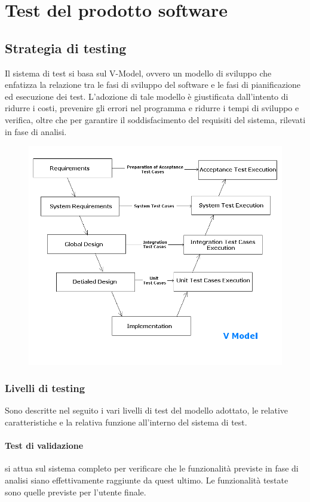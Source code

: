 \documentclass[12pt,a4paper]{article}
\begin{document}
\newpage

\section{Test del prodotto software}\label{test}

\subsection{Strategia di testing}\label{test_strategia}
Il sistema di test si basa sul V-Model, ovvero un modello di sviluppo che enfatizza la relazione tra le fasi di sviluppo del software e le fasi di pianificazione ed esecuzione dei test. L'adozione di tale modello è giustificata dall'intento di ridurre i costi, prevenire gli errori nel programma e ridurre i tempi di sviluppo e verifica, oltre che per garantire il soddisfacimento del requisiti del sistema, rilevati in fase di analisi.
\begin{figure}[h]
\centering
\includegraphics[width=0.9\linewidth]{../img/v-model}
\caption[V Model]{}
\label{fig:v-model}
\end{figure}

\subsubsection{Livelli di testing}
Sono descritte nel seguito i vari livelli di test del modello adottato, le relative caratteristiche e la relativa funzione all'interno del sistema di test. 
	\paragraph{Test di validazione} si attua sul sistema completo per verificare che le funzionalità previste in fase di analisi siano effettivamente raggiunte da quest ultimo. Le funzionalità testate sono quelle previste per l'utente finale.
\end{document}

